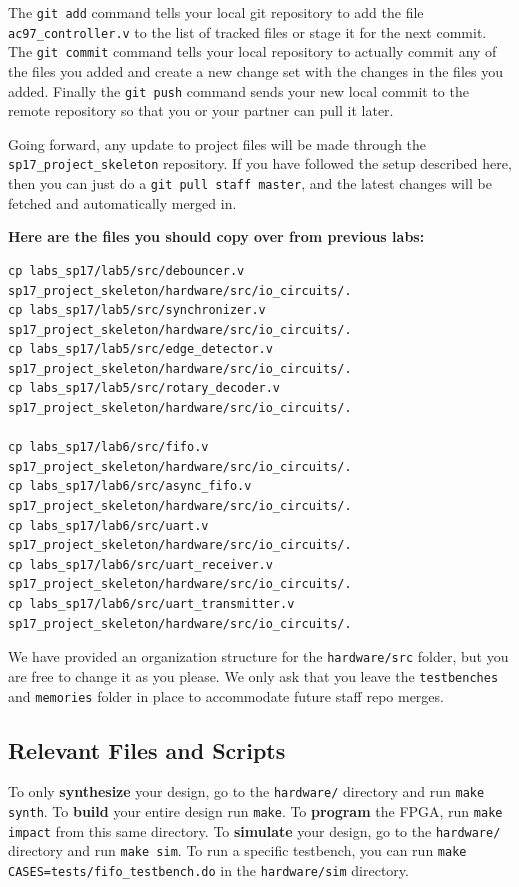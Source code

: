 \documentclass[11pt]{article}
\begin{document}
The \verb|git add| command tells your local git repository to add the file \verb|ac97_controller.v| to the list of tracked files or stage it for the next commit. The \verb|git commit| command tells your local repository to actually commit any of the files you added and create a new change set with the changes in the files you added. Finally the \verb|git push| command sends your new local commit to the remote repository so that you or your partner can pull it later.

Going forward, any update to project files will be made through the \verb|sp17_project_skeleton| repository. If you have followed the setup described here, then you can just do a \verb|git pull staff master|, and the latest changes will be fetched and automatically merged in.

\textbf{Here are the files you should copy over from previous labs:}

\begin{verbatim}
cp labs_sp17/lab5/src/debouncer.v sp17_project_skeleton/hardware/src/io_circuits/.
cp labs_sp17/lab5/src/synchronizer.v sp17_project_skeleton/hardware/src/io_circuits/.
cp labs_sp17/lab5/src/edge_detector.v sp17_project_skeleton/hardware/src/io_circuits/.
cp labs_sp17/lab5/src/rotary_decoder.v sp17_project_skeleton/hardware/src/io_circuits/.

cp labs_sp17/lab6/src/fifo.v sp17_project_skeleton/hardware/src/io_circuits/.
cp labs_sp17/lab6/src/async_fifo.v sp17_project_skeleton/hardware/src/io_circuits/.
cp labs_sp17/lab6/src/uart.v sp17_project_skeleton/hardware/src/io_circuits/.	
cp labs_sp17/lab6/src/uart_receiver.v sp17_project_skeleton/hardware/src/io_circuits/.
cp labs_sp17/lab6/src/uart_transmitter.v sp17_project_skeleton/hardware/src/io_circuits/.
\end{verbatim}

We have provided an organization structure for the \verb|hardware/src| folder, but you are free to change it as you please. We only ask that you leave the \verb|testbenches| and \verb|memories| folder in place to accommodate future staff repo merges.

\subsection{Relevant Files and Scripts}
To only \textbf{synthesize} your design, go to the \verb|hardware/| directory and run \verb|make synth|. To \textbf{build} your entire design run \verb|make|. To \textbf{program} the FPGA, run \verb|make impact| from this same directory. To \textbf{simulate} your design, go to the \verb|hardware/| directory and run \verb|make sim|. To run a specific testbench, you can run \verb|make CASES=tests/fifo_testbench.do| in the \verb|hardware/sim| directory.
\end{document}
